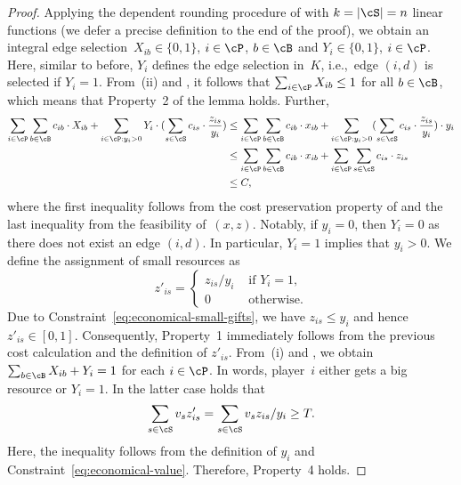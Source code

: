 \documentclass[a4paper,USenglish,cleveref,thm-restate]{lipics-v2021}
\begin{document}
\begin{proof}
Applying the dependent rounding procedure of 
with $k = |\cS| = n$ linear functions (we defer a precise definition to the end of the proof),
we obtain an integral edge selection~$X_{ib}\in\{0,1\}$, $i\in \cP$, $b\in \cB$ and $Y_i\in\{0,1\}$, $i\in \cP$.
Here, similar to before, $Y_i$ defines the edge selection in~$K$,
i.e.,~edge $(i, d)$ is selected if $Y_i = 1$.
From~(ii) and , it follows that
$\sum_{i\in \cP} X_{ib} \le 1$ for all $b\in \cB$,
which means that Property~2 of the lemma holds.
Further,
\begin{align*}
    \sum_{i\in\cP}\sum_{b\in\cB} c_{ib}\cdot X_{ib} +  \sum_{i\in\cP : y_i > 0} Y_i \cdot (\sum_{s\in\cS} c_{is}\cdot \frac{z_{is}}{y_i}) 
    &\le \sum_{i\in\cP}\sum_{b\in\cB} c_{ib}\cdot x_{ib} +  \sum_{i\in\cP : y_i > 0}(\sum_{s\in\cS} c_{is}\cdot \frac{z_{is}}{y_i}) \cdot y_i\\
    &\le \sum_{i\in\cP}\sum_{b\in\cB} c_{ib}\cdot x_{ib} +  \sum_{i\in\cP}\sum_{s\in\cS} c_{is}\cdot z_{is} \\
    &\leq C,
\end{align*}
where the first inequality follows from the cost preservation
property of  and the last inequality from the feasibility of~$(x,z)$. 
Notably, if $y_i = 0$, then $Y_i = 0$ as
there does not exist an edge $(i, d)$.
In particular, $Y_i = 1$ implies that $y_i > 0$.
We define the assignment of small resources as 
\begin{equation*}
z'_{is} = \begin{cases}
     z_{is}/y_i &\text{ if } Y_i = 1,\\
     0 &\text{ otherwise.}
\end{cases}
\end{equation*}
Due to Constraint~\eqref{eq:economical-small-gifts}, we have $z_{is} \le y_i$ and hence $z'_{is} \in [0, 1]$. Consequently, Property~1
immediately follows from the previous cost calculation and the definition of $z'_{is}$.
From~(i) and , we obtain $\sum_{b\in \cB} X_{ib} + Y_i = 1$ for each $i\in \cP$.
In words, player~$i$ either gets a big resource or $Y_i = 1$.
In the latter case holds that
\begin{equation*}
    \sum_{s\in \cS} v_s z'_{is} = 
    \sum_{s\in \cS} v_s z_{is} / y_i \ge T .
\end{equation*}
Here, the inequality follows from the definition of $y_i$ 
and Constraint~\eqref{eq:economical-value}.
Therefore, Property~4 holds.


\end{proof}
\end{document}
